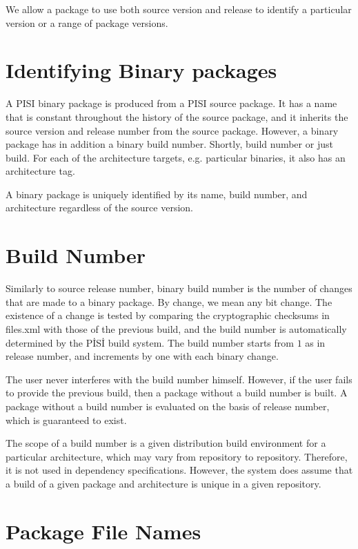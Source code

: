 \documentclass[a4paper,11pt]{article}
\begin{document}
We allow a package to use both source version and release to identify
a particular version or a range of package versions.

\section{Identifying Binary packages}

A PISI binary package is produced from a PISI source package. It has a
name that is constant throughout the history of the source package,
and it inherits the source version and release number from the source
package. However, a binary package has in addition a binary build
number. Shortly, build number or just build. For each of the
architecture targets, e.g. particular binaries, it also has an
architecture tag.

A binary package is uniquely identified by its name, build number, and
architecture regardless of the source version.

\section{Build Number}

Similarly to source release number, binary build number is the number
of changes that are made to a binary package. By change, we mean any
bit change.  The existence of a change is tested by comparing the
cryptographic checksums in files.xml with those of the previous build, and the
build number is automatically determined by the P\.IS\.I build system.
The build number starts from $1$ as in release number, and increments
by one with each binary change.

The user never interferes with the build number himself. However, if
the user fails to provide the previous build, then a package without
a build number is built. A package without a build number is evaluated
on the basis of release number, which is guaranteed to exist.

The scope of a build number is a given distribution build environment
for a particular architecture, which may vary from repository to 
repository. Therefore, it is not used in dependency
specifications. However, the system does assume that a build of a  
given package and architecture is unique in a given repository.

\section{Package File Names}
\end{document}
